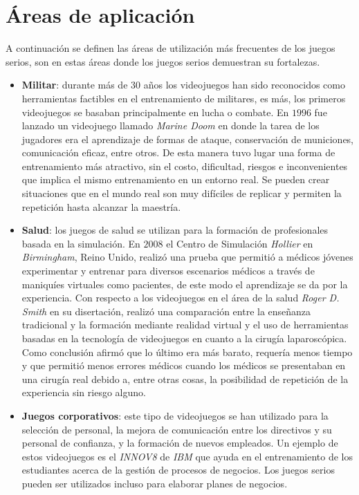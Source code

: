 \section{Áreas de aplicación}
\label{sec:areas_aplicacion}

A continuación se definen las áreas de utilización  más frecuentes de los juegos
serios, son en estas áreas donde los juegos serios demuestran su fortalezas.

\begin{itemize}

\item \textbf{Militar}: durante más de $30$ años los videojuegos han sido
    reconocidos como herramientas factibles en el entrenamiento de militares, es
    más, los primeros videojuegos se basaban principalmente en lucha o combate.
    En $1996$ fue lanzado un videojuego llamado \emph{Marine Doom} en donde la
    tarea de los jugadores era el aprendizaje de formas de ataque, conservación
    de municiones, comunicación eficaz, 
    entre otros. De esta manera tuvo lugar una forma de entrenamiento más
    atractivo, sin el costo, dificultad, riesgos e inconvenientes que implica el
    mismo entrenamiento en un entorno real. Se pueden crear situaciones
    que en el mundo real son muy difíciles de replicar y permiten
    la repetición hasta alcanzar la maestría\cite{education:games}.

\item \textbf{Salud}: los juegos
    de salud se utilizan para la formación de profesionales basada en la
    simulación. En $2008$ el Centro de Simulación \emph{Hollier} en
    \emph{Birmingham}, Reino Unido, realizó una prueba que permitió a médicos
    jóvenes experimentar y entrenar para diversos escenarios médicos a través de
    maniquíes virtuales como pacientes, de este modo el aprendizaje se da por la
    experiencia. Con respecto a los videojuegos en el área de la salud
    \emph{Roger D. Smith} en su disertación, realizó una comparación entre la
    enseñanza tradicional y la formación mediante realidad virtual y el uso de
    herramientas basadas en la tecnología de videojuegos en cuanto a la cirugía
    laparoscópica. Como conclusión afirmó que lo último era más barato, requería
    menos tiempo y que permitió menos errores médicos cuando los médicos se
    presentaban en una cirugía real debido a, entre otras cosas, la posibilidad
    de repetición de la experiencia sin riesgo alguno\cite{education:games}. 

\item \textbf{Juegos corporativos}: este tipo de videojuegos se han utilizado
    para la selección de personal, la mejora de comunicación entre los
    directivos y su personal de confianza, y la formación de nuevos empleados.
    Un ejemplo de estos videojuegos es el \emph{INNOV8} de \emph{IBM} que ayuda
    en el entrenamiento de los estudiantes acerca de la gestión de procesos de
    negocios. Los juegos serios pueden ser utilizados incluso para elaborar
    planes de negocios\cite{education:games}. 

\end{itemize}
